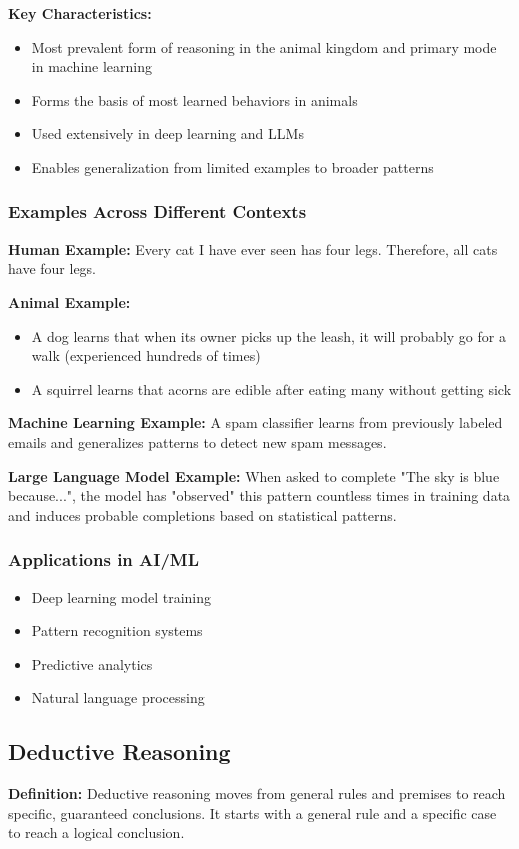 \textbf{Key Characteristics:}
\begin{itemize}
    \item Most prevalent form of reasoning in the animal kingdom and primary mode in machine learning
    \item Forms the basis of most learned behaviors in animals
    \item Used extensively in deep learning and LLMs
    \item Enables generalization from limited examples to broader patterns
\end{itemize}

\subsubsection{Examples Across Different Contexts}
\textbf{Human Example:} Every cat I have ever seen has four legs. Therefore, all cats have four legs.

\textbf{Animal Example:}
\begin{itemize}
    \item A dog learns that when its owner picks up the leash, it will probably go for a walk (experienced hundreds of times)
    \item A squirrel learns that acorns are edible after eating many without getting sick
\end{itemize}

\textbf{Machine Learning Example:} A spam classifier learns from previously labeled emails and generalizes patterns to detect new spam messages.

\textbf{Large Language Model Example:} When asked to complete "The sky is blue because...", the model has "observed" this pattern countless times in training data and induces probable completions based on statistical patterns.

\subsubsection{Applications in AI/ML}
\begin{itemize}
    \item Deep learning model training
    \item Pattern recognition systems
    \item Predictive analytics
    \item Natural language processing
\end{itemize}

\subsection{Deductive Reasoning}
\textbf{Definition:} Deductive reasoning moves from general rules and premises to reach specific, guaranteed conclusions. It starts with a general rule and a specific case to reach a logical conclusion.

